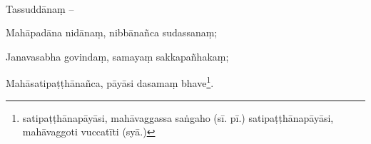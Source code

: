 
\paragraph{}
Tassuddānaṃ –

Mahāpadāna nidānaṃ, nibbānañca sudassanaṃ;

Janavasabha govindaṃ, samayaṃ sakkapañhakaṃ;

Mahāsatipaṭṭhānañca, pāyāsi dasamaṃ bhave\footnote{satipaṭṭhānapāyāsi, mahāvaggassa saṅgaho (sī. pī.) satipaṭṭhānapāyāsi, mahāvaggoti vuccatīti (syā.)}.


